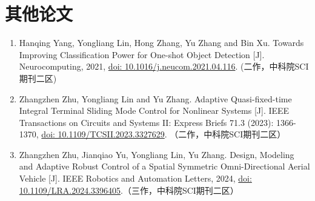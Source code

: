 \begin{sloppypar}
\section*{其他论文}
\begin{enumerate}
    \item Hanqing Yang, Yongliang Lin, Hong Zhang, Yu Zhang and Bin Xu. Towards Improving Classification Power for One-shot Object Detection [J]. Neurocomputing, 2021, \href{https://doi.org/10.1016/j.neucom.2021.04.116}{doi: 10.1016/j.neucom.2021.04.116}. (二作，中科院SCI期刊二区)
    \item Zhangzhen Zhu, Yongliang Lin and Yu Zhang. Adaptive Quasi-fixed-time Integral Terminal Sliding Mode Control for Nonlinear Systems [J]. IEEE Transactions on Circuits and Systems II: Express Briefs 71.3 (2023): 1366-1370, \href{https://doi.org/10.1109/TCSII.2023.3327629}{doi: 10.1109/TCSII.2023.3327629}. （二作，中科院SCI期刊二区）
    \item Zhangzhen Zhu, Jianqiao Yu, Yongliang Lin, Yu Zhang. Design, Modeling and Adaptive Robust Control of a Spatial Symmetric Omni-Directional Aerial Vehicle [J]. IEEE Robotics and Automation Letters, 2024, \href{https://doi.org/10.1109/LRA.2024.3396405}{doi: 10.1109/LRA.2024.3396405}.（三作，中科院SCI期刊二区）
\end{enumerate}
\end{sloppypar}